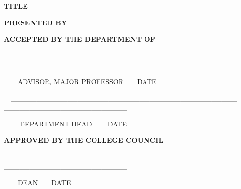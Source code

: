 \bigskip


\bigskip


\bigskip


\bigskip


\bigskip


\bigskip


\bigskip


\bigskip

{
\textsf{\textbf{TITLE}}\textbf{\ \ }\ \ \textsf{ \ \ }}


\bigskip


\bigskip


\bigskip


\bigskip


\bigskip


\bigskip

{
\textsf{\textbf{PRESENTED
BY}}\textsf{\textbf{\ \ }}\textsf{\textbf{\ \ }}\textsf{
}\textsf{\ \ }}


\bigskip


\bigskip


\bigskip

{\sffamily\bfseries
ACCEPTED BY THE DEPARTMENT OF }


\bigskip


\bigskip


\bigskip


\bigskip


\bigskip


\bigskip

{
\textsf{\ \ \_\_\_\_\_\_\_\_\_\_\_\_\_\_\_\_\_\_\_\_\_\_\_\_\_\_\_\_\_\_\_\_\_\_\_\_\_\_\_\_\_\_\_\_\ \ \ \ \_\_\_\_\_\_\_\_\_\_\_\_\_\_\_\_\_\_\_\_\_\_\_\_\ \ }}

{
\textsf{\ \ \ \ }\textsf{ADVISOR, MAJOR PROFESSOR}\textsf{\ \ \ \ 
}\textsf{DATE}}


\bigskip


\bigskip

{
\textsf{\ \ \_\_\_\_\_\_\_\_\_\_\_\_\_\_\_\_\_\_\_\_\_\_\_\_\_\_\_\_\_\_\_\_\_\_\_\_\_\_\_\_\_\_\_\_\ \ \ \ \_\_\_\_\_\_\_\_\_\_\_\_\_\_\_\_\_\_\_\_\_\_\_\_}\textsf{\ \ }}

{
\textsf{\textbf{\ \ \ \ }}\textsf{DEPARTMENT
HEAD}\textsf{\textbf{\ \ \ \ }}\textsf{DATE}}


\bigskip


\bigskip


\bigskip

{\sffamily\bfseries
APPROVED BY THE COLLEGE COUNCIL}


\bigskip


\bigskip

{
\textsf{\ \ \_\_\_\_\_\_\_\_\_\_\_\_\_\_\_\_\_\_\_\_\_\_\_\_\_\_\_\_\_\_\_\_\_\_\_\_\_\_\_\_\_\_\_\_\ \ \ \ \_\_\_\_\_\_\_\_\_\_\_\_\_\_\_\_\_\_\_\_\_\_\_\_}\textsf{\ \ \ \ \ \ }}

{
\textsf{\ \ \ \ }\textsf{DEAN}\textsf{\ \ \ \ }\textsf{DATE}}

